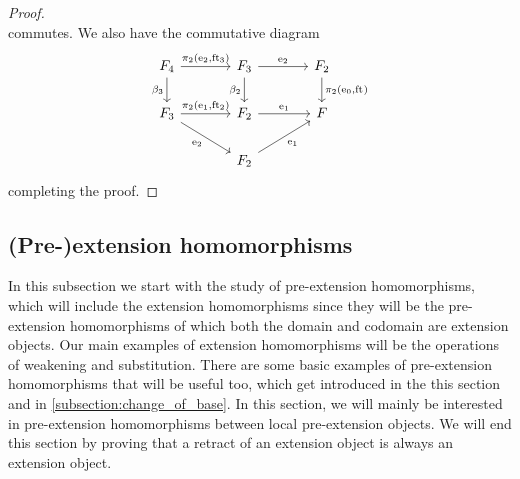 \begin{proof}
\begin{equation*}
\end{equation*}
commutes. We also have the commutative diagram
\begin{equation*}
\begin{tikzcd}[column sep=large]
\stesysf_4
  \ar{r}{\pullbackpr{2}{\eext{2}}{\eft[3]}}
  \ar{d}[swap]{\beta_3}
  &
\stesysf_3
  \ar{r}{\eext{2}}
  \ar{d}[swap]{\beta_2}
  &
\stesysf_2
  \ar{d}{\pullbackpr{2}{\ectxext}{\eft}}
  \\
\stesysf_3
  \ar{r}{\pullbackpr{2}{\efamext}{\eft[2]}}
  \ar{dr}[swap]{\eext{2}}
  &
\stesysf_2
  \ar{r}{\efamext}
  &
\stesysf
  \\
  {} &
\stesysf_2
  \ar{ur}[swap]{\efamext}
\end{tikzcd}
\end{equation*}
completing the proof.
\end{proof}

\subsection{(Pre-)extension homomorphisms}\label{subsection:e_extension_homomorphisms}
In this subsection we start with the study of pre-extension homomorphisms, which
will include the extension homomorphisms since they will be the pre-extension
homomorphisms of which both the domain and codomain are extension objects.
Our main examples of extension homomorphisms will be the operations of weakening
and substitution. There are some basic examples of pre-extension homomorphisms
that will be useful too, which get introduced in the this section and in
\autoref{subsection:change_of_base}. In this section, we will mainly be
interested in pre-extension homomorphisms between local pre-extension objects.
We will end this section by proving that a retract of an extension object is
always an extension object.

